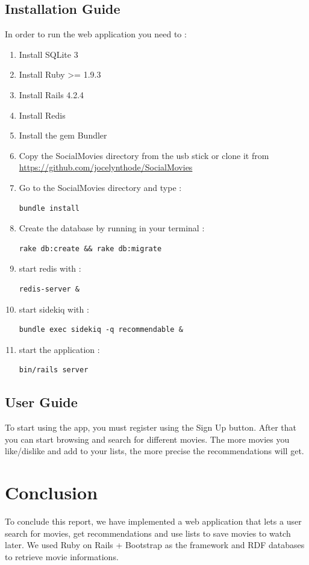 \documentclass[12pt,a4paper]{article}
\begin{document}
\subsection{Installation Guide}
In order to run the web application you need to :
\begin{enumerate}
\item Install SQLite 3
\item Install Ruby >= 1.9.3
\item Install Rails 4.2.4
\item Install Redis
\item Install the gem Bundler
\item Copy the SocialMovies directory from the usb stick or clone it from \href{https://github.com/jocelynthode/SocialMovies}{https://github.com/jocelynthode/SocialMovies}
\item Go to the SocialMovies directory and type : \begin{lstlisting} 
bundle install 
\end{lstlisting}
\item Create the database by running in your terminal :
\begin{lstlisting} 
rake db:create && rake db:migrate
\end{lstlisting}
\item start redis with :
\begin{lstlisting} 
redis-server &
\end{lstlisting}
\item start sidekiq with :
\begin{lstlisting} 
bundle exec sidekiq -q recommendable &
\end{lstlisting}
\item start the application :
\begin{lstlisting} 
bin/rails server
\end{lstlisting}
\end{enumerate}
\subsection{User Guide}
To start using the app, you must register using the Sign Up button. After that you can start browsing and search for different movies. The more movies you like/dislike and add to your lists, the more precise the recommendations will get.


\section{Conclusion}
To conclude this report, we have implemented a web application that lets a user search for movies, get recommendations and use lists to save movies to watch later. We used Ruby on Rails + Bootstrap as the framework and RDF databases to retrieve movie informations.
\end{document}
